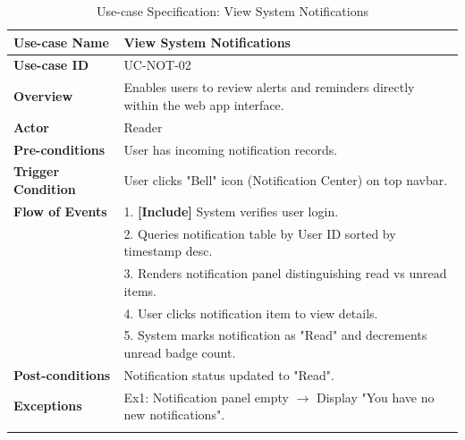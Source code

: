 \newpage
\begin{longtable}{|p{3.5cm}|p{11.5cm}|}
    \hline
    \textbf{Use-case Name} & \textbf{View System Notifications} \\
    \hline
    \textbf{Use-case ID} & UC-NOT-02 \\
    \hline
    \textbf{Overview} & Enables users to review alerts and reminders directly within the web app interface. \\
    \hline
    \textbf{Actor} & Reader \\
    \hline
    \textbf{Pre-conditions} & User has incoming notification records. \\
    \hline
    \textbf{Trigger Condition} & User clicks "Bell" icon (Notification Center) on top navbar. \\
    \hline
    \textbf{Flow of Events} & 
    1. \textbf{[Include]} System verifies user login.\\ 
 & 
    2. Queries notification table by User ID sorted by timestamp desc.\\ 
 & 
    3. Renders notification panel distinguishing read vs unread items.\\ 
 & 
    4. User clicks notification item to view details.\\ 
 & 
    5. System marks notification as "Read" and decrements unread badge count. \\
    \hline
    \textbf{Post-conditions} & Notification status updated to "Read". \\
    \hline
    \textbf{Exceptions} & 
    Ex1: Notification panel empty $\rightarrow$ Display "You have no new notifications". \\
    \hline
    \caption{Use-case Specification: View System Notifications} \\
\end{longtable}

